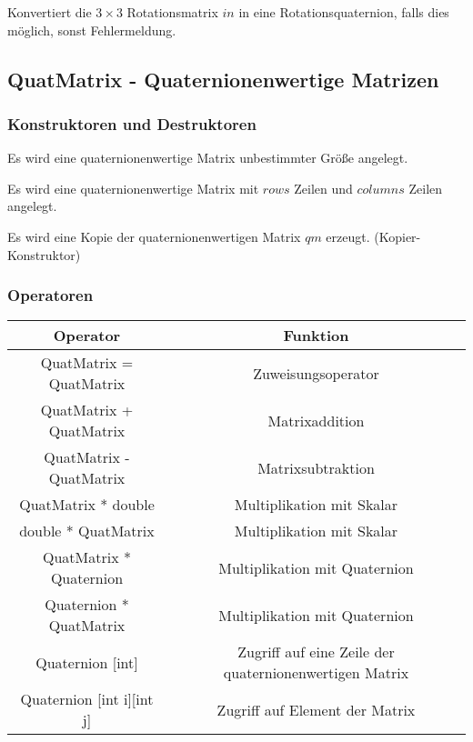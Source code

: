  		\descr
 		{
 			Konvertiert die $3\times 3$ Rotationsmatrix $in$ in eine Rotationsquaternion,
 			falls dies möglich, sonst Fehlermeldung.
 		}
\subsection{QuatMatrix - Quaternionenwertige Matrizen}
\hypertarget{QuatMatrix}{}
\subsubsection{Konstruktoren und Destruktoren}
		\descr
	{
		Es wird eine quaternionenwertige Matrix unbestimmter Größe angelegt.
	}
	
	\descr
	{
		Es wird eine quaternionenwertige Matrix mit $rows$ Zeilen und $columns$
		Zeilen angelegt.
	}
	
	\descr
	{
		Es wird eine Kopie der quaternionenwertigen Matrix $qm$ erzeugt.
		(Kopier-Konstruktor)
	}
	
	\subsubsection{Operatoren}
		\begin{tabular}{|c|c|}
			\hline
			Operator & Funktion\\ 
			\hline
			QuatMatrix = QuatMatrix & Zuweisungsoperator\\
			\hline
			QuatMatrix + QuatMatrix & Matrixaddition\\
			\hline
			QuatMatrix - QuatMatrix & Matrixsubtraktion\\
			\hline
			QuatMatrix * double & Multiplikation mit Skalar\\
			\hline
			double * QuatMatrix & Multiplikation mit Skalar\\
			\hline
			QuatMatrix * Quaternion & Multiplikation mit Quaternion\\
			\hline
			Quaternion * QuatMatrix & Multiplikation mit Quaternion\\
			\hline
			Quaternion [int] & Zugriff auf eine Zeile der quaternionenwertigen Matrix\\
			\hline
			Quaternion [int i][int j] & Zugriff auf Element der Matrix
		\end{tabular}
		
